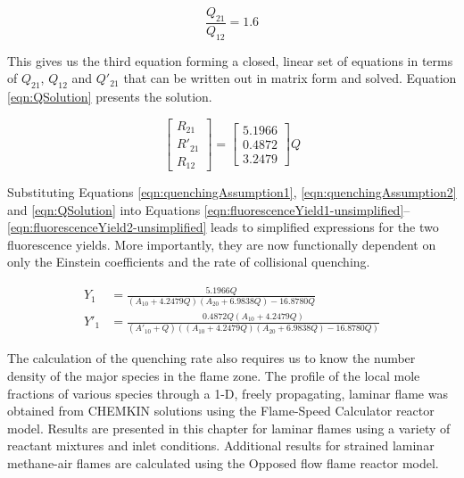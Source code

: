 \begin{equation}
  \frac{Q_{21}}{Q_{12}} = 1.6
  \label{eqn:QEquation3}
\end{equation}

This gives us the third equation forming a closed, linear set of equations in terms of \(Q_{21}\), \(Q_{12}\) and \(Q'_{21}\) that can be written out in matrix form and solved.
Equation \ref{eqn:QSolution} presents the solution.

\begin{equation}
  \left[
    \begin{matrix}
      R_{21}\\
      R'_{21}\\
      R_{12}
    \end{matrix}
  \right] = \left[
   \begin{matrix}
      5.1966\\
      0.4872\\
      3.2479
    \end{matrix}
  \right] Q
  \label{eqn:QSolution}
\end{equation}

Substituting Equations \ref{eqn:quenchingAssumption1}, \ref{eqn:quenchingAssumption2} and \ref{eqn:QSolution} into Equations \ref{eqn:fluorescenceYield1-unsimplified}--\ref{eqn:fluorescenceYield2-unsimplified} leads to simplified expressions for the two fluorescence yields.
More importantly, they are now functionally dependent on only the Einstein coefficients and the rate of collisional quenching.

\begin{align}
  Y_1 &= \frac{ 5.1966Q }{ ( A_{10} + 4.2479Q )( A_{20} + 6.9838Q ) - 16.8780Q }
  \label{eqn:fluorescenceYield1}\\
  Y'_1 &= \frac{ 0.4872Q( A_{10} + 4.2479Q ) }{ ( A'_{10} + Q ) \left( ( A_{10} + 4.2479Q )( A_{20} + 6.9838Q ) - 16.8780Q \right) }
  \label{eqn:fluorescenceYield2}
\end{align}



The calculation of the quenching rate also requires us to know the number density of the major species in the flame zone.
The profile of the local mole fractions of various species through a 1-D, freely propagating, laminar flame was obtained from CHEMKIN solutions using the Flame-Speed Calculator reactor model.
Results are presented in this chapter for laminar flames using a variety of reactant mixtures and inlet conditions.
Additional results for strained laminar methane-air flames are calculated using the Opposed flow flame reactor model.

